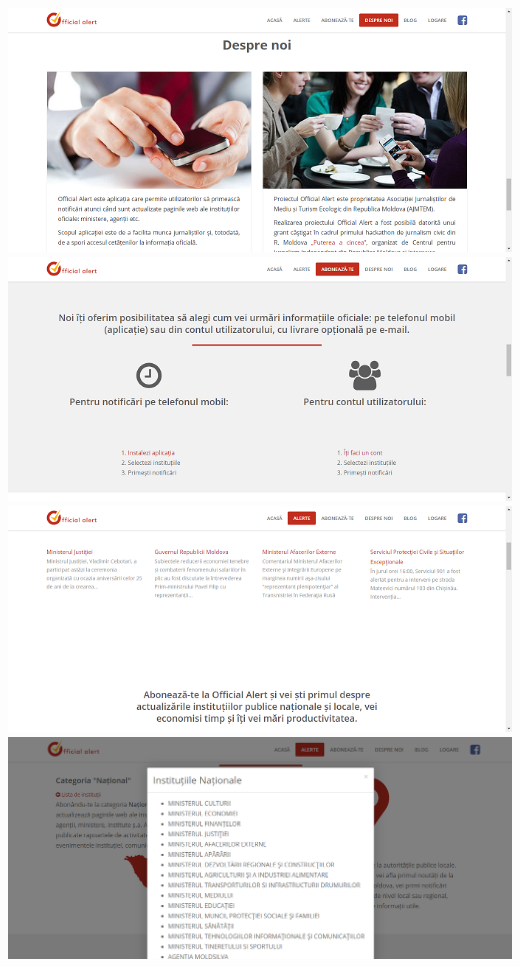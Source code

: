 \documentclass[12pt]{article}
\begin{document}
 \includegraphics{about.png}\\
 
 \includegraphics{aboneazate.png}\\ 
 \includegraphics{alerte.png}\\
 \includegraphics{popup.png}\\
 
\end{document}
